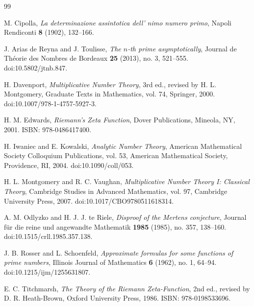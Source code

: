 \documentclass[11pt]{amsart}
\numberwithin{equation}{section}
\theoremstyle{plain}
\theoremstyle{definition}
\theoremstyle{remark}
\begin{document}
\begin{thebibliography}{99}


M. Cipolla,
\emph{La determinazione assintotica dell' nimo numero primo},
Napoli Rendiconti \textbf{8} (1902), 132--166.

J. Arias de Reyna and J. Toulisse,
\emph{The $n$-th prime asymptotically},
Journal de Th\'eorie des Nombres de Bordeaux \textbf{25} (2013), no. 3,
521--555.
doi:10.5802/jtnb.847.

H. Davenport,
\emph{Multiplicative Number Theory},
3rd ed., revised by H. L. Montgomery,
Graduate Texts in Mathematics, vol. 74, Springer, 2000.
doi:10.1007/978-1-4757-5927-3.

H. M. Edwards,
\emph{Riemann's Zeta Function},
Dover Publications, Mineola, NY, 2001.
ISBN: 978-0486417400.

H. Iwaniec and E. Kowalski,
\emph{Analytic Number Theory},
American Mathematical Society Colloquium Publications, vol. 53,
American Mathematical Society, Providence, RI, 2004.
doi:10.1090/coll/053.

H. L. Montgomery and R. C. Vaughan,
\emph{Multiplicative Number Theory I: Classical Theory},
Cambridge Studies in Advanced Mathematics, vol. 97,
Cambridge University Press, 2007.
doi:10.1017/CBO9780511618314.

A. M. Odlyzko and H. J. J. te Riele,
\emph{Disproof of the Mertens conjecture},
Journal f\"ur die reine und angewandte Mathematik \textbf{1985} (1985),
no. 357, 138--160.
doi:10.1515/crll.1985.357.138.

J. B. Rosser and L. Schoenfeld,
\emph{Approximate formulas for some functions of prime numbers},
Illinois Journal of Mathematics \textbf{6} (1962), no. 1, 64--94.
doi:10.1215/ijm/1255631807.

E. C. Titchmarsh,
\emph{The Theory of the Riemann Zeta-Function},
2nd ed., revised by D. R. Heath-Brown,
Oxford University Press, 1986.
ISBN: 978-0198533696.

\end{thebibliography}
\end{document}
